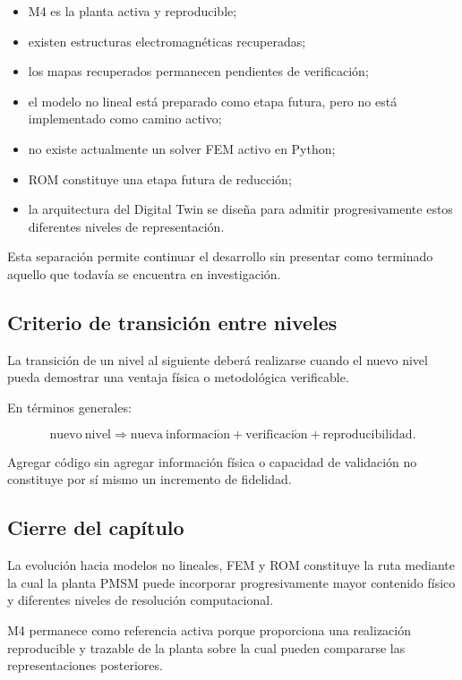 \begin{itemize}
\item M4 es la planta activa y reproducible;
\item existen estructuras electromagnéticas recuperadas;
\item los mapas recuperados permanecen pendientes de verificación;
\item el modelo no lineal está preparado como etapa futura, pero no está implementado como camino activo;
\item no existe actualmente un solver FEM activo en Python;
\item ROM constituye una etapa futura de reducción;
\item la arquitectura del Digital Twin se diseña para admitir progresivamente estos diferentes niveles de representación.
\end{itemize}

Esta separación permite continuar el desarrollo sin presentar como terminado aquello que todavía se encuentra en investigación.

\subsection{Criterio de transición entre niveles}

La transición de un nivel al siguiente deberá realizarse cuando el nuevo nivel pueda demostrar una ventaja física o metodológica verificable.

En términos generales:

\begin{equation}
\mathrm{nuevo\ nivel}
\Rightarrow
\mathrm{nueva\ informaci\acute{o}n}
+
\mathrm{verificaci\acute{o}n}
+
\mathrm{reproducibilidad}.
\end{equation}

Agregar código sin agregar información física o capacidad de validación no constituye por sí mismo un incremento de fidelidad.

\subsection{Cierre del capítulo}

La evolución hacia modelos no lineales, FEM y ROM constituye la ruta mediante la cual la planta PMSM puede incorporar progresivamente mayor contenido físico y diferentes niveles de resolución computacional.

M4 permanece como referencia activa porque proporciona una realización reproducible y trazable de la planta sobre la cual pueden compararse las representaciones posteriores.

